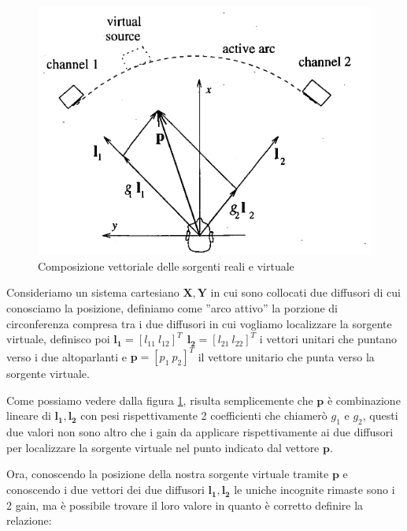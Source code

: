 \documentclass[12pt,a4paper]{report}
\begin{document}
\begin{figure}[htbp]
	\centering
	\includegraphics[scale=0.48]{figures/matrix2d.png}
	\caption {Composizione vettoriale delle sorgenti reali e virtuale}
	\label{fig:vettori2d}
	\end{figure}

Consideriamo un sistema cartesiano $ \boldsymbol{X},\boldsymbol{Y}$ in cui sono collocati due diffusori di cui conosciamo la posizione, definiamo come ''arco attivo'' la porzione di circonferenza compresa tra i due diffusori in cui vogliamo localizzare la sorgente virtuale, definisco poi $\boldsymbol{l_{1}}= {\left[ l_{11} \ l_{12} \right]}^T \ \  \boldsymbol{l_{2}}= {\left[ l_{21} \ l_{22} \right]}^T$ i vettori unitari che puntano verso i due altoparlanti e $\boldsymbol{p}= {\left[ p_1 \ p_2 \right]}^T$ il vettore unitario che punta verso la sorgente virtuale.

Come possiamo vedere dalla figura \ref{fig:vettori2d}, risulta semplicemente che $\boldsymbol{p}$ è combinazione lineare di $\boldsymbol{l_{1}}, \boldsymbol{l_{2}}$ con pesi rispettivamente 2 coefficienti che chiamerò $g_1$ e $g_2$, questi due valori non sono altro che i gain da applicare rispettivamente ai due diffusori per localizzare la sorgente virtuale nel punto indicato dal vettore $\boldsymbol{p}$.

Ora, conoscendo la posizione della nostra sorgente virtuale tramite $\boldsymbol{p}$ e conoscendo i due vettori dei due diffusori $\boldsymbol{l_{1}}, \boldsymbol{l_{2}}$ le uniche incognite rimaste sono i 2 gain, ma è possibile trovare il loro valore in quanto è corretto definire la relazione: %
\end{document}
